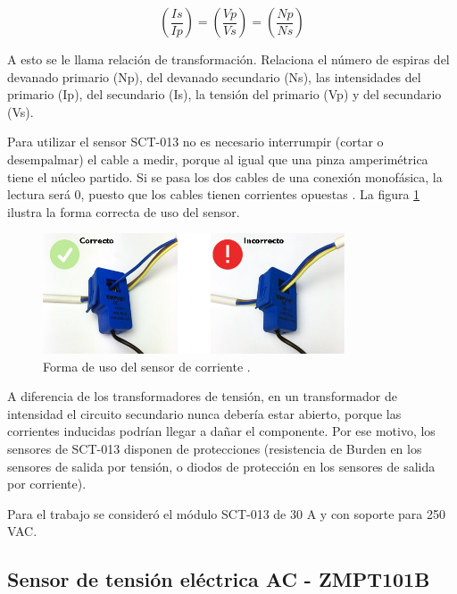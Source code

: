 \begin{equation}
	\label{eq:proporcionform}
	\left( \frac{Is}{Ip} \right)=\left( \frac{Vp}{Vs} \right)=\left( \frac{Np}{Ns} \right)
\end{equation}

A esto se le llama relación de transformación. Relaciona el número de espiras del devanado primario (Np), del devanado secundario (Ns), las intensidades del primario (Ip), del secundario (Is), la tensión del primario (Vp) y del secundario (Vs). 


Para utilizar el sensor SCT-013 no es necesario interrumpir (cortar o desempalmar) el cable a medir, porque al igual que una pinza amperimétrica tiene el núcleo partido. Si se pasa los dos cables de una conexión monofásica, la lectura será 0, puesto que los cables tienen corrientes opuestas \citep{WEBSITE:21}. La figura \ref{fig:conectacorrecto} ilustra la forma correcta de uso del sensor.
\vspace{0.5cm}
\begin{figure}[htpb]
\centering 
\includegraphics[width=0.8\textwidth]{./Figures/correcto.jpg}
\caption{Forma de uso del sensor de corriente \protect\footnotemark.}
\label{fig:conectacorrecto}
\end{figure}



A diferencia de los transformadores de tensión, en un transformador de intensidad el circuito secundario nunca debería estar abierto, porque las corrientes inducidas podrían llegar a dañar el componente. Por ese motivo, los sensores de SCT-013 disponen de protecciones (resistencia de Burden en los sensores de salida por tensión, o diodos de protección en los sensores de salida por corriente)\citep{WEBSITE:9}.

Para el trabajo se consideró el módulo SCT-013 de 30 A y con soporte para 250 VAC.
\subsection{Sensor de tensión eléctrica AC - ZMPT101B}

